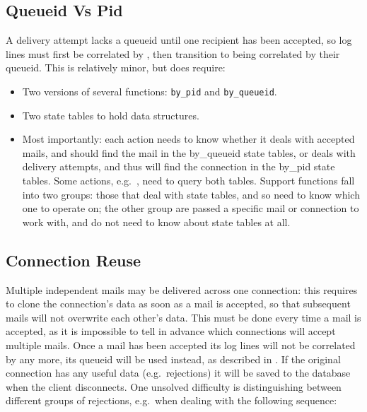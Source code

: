 \subsection{Queueid Vs Pid}

\label{queueid vs pid}

A delivery attempt lacks a queueid until one recipient has been accepted,
so log lines must first be correlated by  , then
transition to being correlated by their queueid.  This is relatively minor,
but does require:

\begin{itemize}

    \item Two versions of several functions: \texttt{by\_pid} and
        \texttt{by\_queueid}.

    \item Two state tables to hold data structures.

    \item Most importantly: each action needs to know whether it deals with
        accepted mails, and should find the mail in the by\_queueid state
        tables, or deals with delivery attempts, and thus will find the
        connection in the by\_pid state tables.  Some actions, e.g.\
        , need to query both tables.  Support
        functions fall into two groups: those that deal with state tables,
        and so need to know which one to operate on; the other group are
        passed a specific mail or connection to work with, and do not need
        to know about state tables at all.

\end{itemize}

\subsection{Connection Reuse}

\label{connection reuse}

Multiple independent mails may be delivered across one connection: this
requires \parsername{} to clone the connection's data as soon as a mail is
accepted, so that subsequent mails will not overwrite each other's data.
This must be done every time a mail is accepted, as it is impossible to
tell in advance which connections will accept multiple mails.  Once a mail
has been accepted its log lines will not be correlated by \acronym{pid} any
more, its queueid will be used instead, as described in \sectionref{queueid
vs pid}.  If the original connection has any useful data (e.g.\ rejections)
it will be saved to the database when the client disconnects.  One unsolved
difficulty is distinguishing between different groups of rejections, e.g.\
when dealing with the following sequence:

